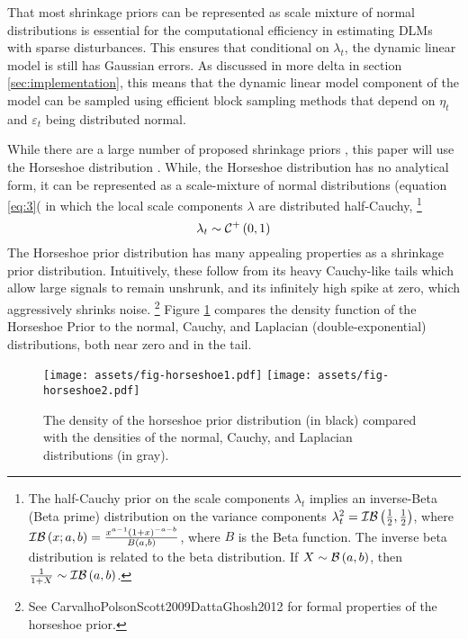 \documentclass{article}
\begin{document}
That most shrinkage priors can be represented as scale mixture of normal distributions is essential for the computational efficiency in estimating DLMs with sparse disturbances.
This ensures that conditional on $\lambda_{t}$, the dynamic linear model is still has Gaussian errors.
As discussed in more delta in section \ref{sec:implementation}, this means that the dynamic linear model component of the model can be sampled using efficient block sampling methods that depend on $\eta_{t}$ and $\varepsilon_{t}$ being distributed normal.

While there are a large number of proposed shrinkage priors \parencites{ArmaganDunsonLee2011}{BrownGriffin2010}{PolsonScott2010}, this paper will use the Horseshoe distribution \parencites{CarvalhoPolsonScott2009}{CarvalhoPolsonScott2010}{PolsonScott2010}{PolsonScott2012}{DattaGhosh2012}.
While, the Horseshoe distribution has no analytical form, it can be represented as a scale-mixture of normal distributions (equation \eqref{eq:3}( in which the local scale components $\lambda$ are distributed half-Cauchy,%
\footnote{
The half-Cauchy prior on the scale components $\lambda_{t}$ implies an inverse-Beta (Beta prime) distribution on the variance components $\lambda_{t}^{2} = \mathcal{IB}\left(\frac{1}{2}, \frac{1}{2}\right)$, where $\mathcal{IB}\left(x; a, b\right) = \frac{x^{a - 1} (1 + x)^{-a - b}}{B(a, b)}$, where $B$ is the Beta function.
The inverse beta distribution is related to the beta distribution.
If $X \sim \mathcal{B}\left(a, b\right)$, then $\frac{1}{1 + X} \sim \mathcal{IB}\left(a, b\right)$.
}
\begin{equation}
  \label{eq:6}
  \lambda_{t} \sim \mathcal{C}^{+}\left(0, 1\right)
\end{equation}
The Horseshoe prior distribution has many appealing properties as a shrinkage prior distribution.
Intuitively, these follow from its heavy Cauchy-like tails which allow large signals to remain unshrunk, and its infinitely high spike at zero, which aggressively shrinks noise.
\footnote{See \textcite{CarvalhoPolsonScott2010}{CarvalhoPolsonScott2009}{DattaGhosh2012} for formal properties of the horseshoe prior.}
Figure \ref{fig:horseshoe} compares the density function of the Horseshoe Prior to the normal, Cauchy, and Laplacian (double-exponential) distributions, both near zero and in the tail.
\begin{figure}
  \centering
  \texttt{[image: assets/fig-horseshoe1.pdf]}
  \texttt{[image: assets/fig-horseshoe2.pdf]}
  \caption{The density of the horseshoe prior distribution (in black) compared with the densities of the normal, Cauchy, and Laplacian distributions (in gray).}
  \label{fig:horseshoe}
\end{figure}
\end{document}
